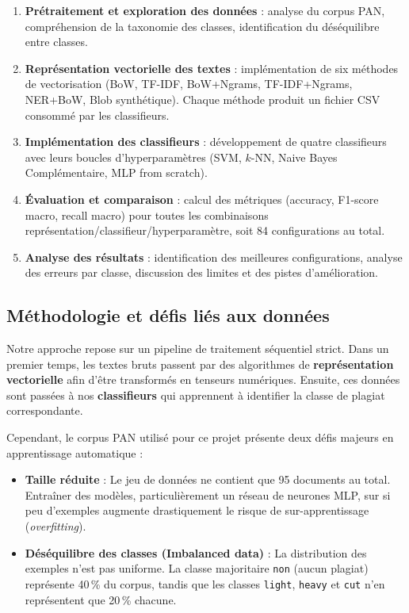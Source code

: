 \documentclass[12pt,a4paper]{article}
\begin{document}
\begin{enumerate}[leftmargin=1.5cm]
    \item \textbf{Prétraitement et exploration des données} : analyse du corpus PAN, compréhension de la taxonomie des classes, identification du déséquilibre entre classes.

    \item \textbf{Représentation vectorielle des textes} : implémentation de six méthodes de vectorisation (BoW, TF-IDF, BoW+Ngrams, TF-IDF+Ngrams, NER+BoW, Blob synthétique). Chaque méthode produit un fichier CSV consommé par les classifieurs.

    \item \textbf{Implémentation des classifieurs} : développement de quatre classifieurs avec leurs boucles d'hyperparamètres (SVM, $k$-NN, Naive Bayes Complémentaire, MLP from scratch).

    \item \textbf{Évaluation et comparaison} : calcul des métriques (accuracy, F1-score macro, recall macro) pour toutes les combinaisons représentation/classifieur/hyperparamètre, soit 84 configurations au total.

    \item \textbf{Analyse des résultats} : identification des meilleures configurations, analyse des erreurs par classe, discussion des limites et des pistes d'amélioration.
\end{enumerate}

\subsection{Méthodologie et défis liés aux données}

Notre approche repose sur un pipeline de traitement séquentiel strict. Dans un premier temps, les textes bruts passent par des algorithmes de \textbf{représentation vectorielle} afin d'être transformés en tenseurs numériques. Ensuite, ces données sont passées à nos \textbf{classifieurs} qui apprennent à identifier la classe de plagiat correspondante.

Cependant, le corpus PAN utilisé pour ce projet présente deux défis majeurs en apprentissage automatique :
\begin{itemize}
    \item \textbf{Taille réduite} : Le jeu de données ne contient que 95 documents au total. Entraîner des modèles, particulièrement un réseau de neurones MLP, sur si peu d'exemples augmente drastiquement le risque de sur-apprentissage (\textit{overfitting}).
    \item \textbf{Déséquilibre des classes (Imbalanced data)} : La distribution des exemples n'est pas uniforme. La classe majoritaire \texttt{non} (aucun plagiat) représente 40\,\% du corpus, tandis que les classes \texttt{light}, \texttt{heavy} et \texttt{cut} n'en représentent que 20\,\% chacune.
\end{itemize}
\end{document}
